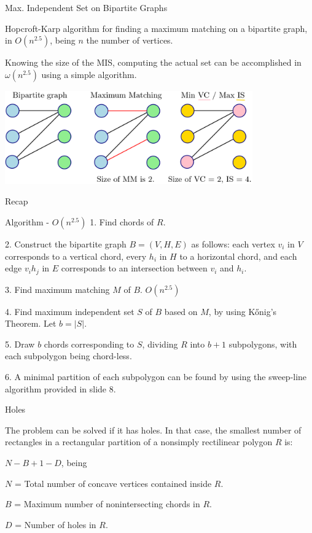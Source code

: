 \documentclass{beamer}
\begin{document}
\begin{frame}[t, shrink=10]{Max. Independent Set on Bipartite Graphs}

Hopcroft-Karp algorithm for finding a maximum matching on a bipartite graph, in $O(n^{2.5})$, being $n$ the number of vertices.

	Knowing the size of the MIS, computing the actual set can be accomplished in $\omega(n^{2.5})$ using a simple algorithm.
	\vspace{10px}

	\centering
    \includegraphics[width=0.8\textwidth]{mis.png}


\end{frame}

\begin{frame}[t, shrink=10]{Recap}

	\begin{block}{Algorithm - $O(n^{2.5})$}
	1. Find chords of $R$.
	
	2. Construct the bipartite graph $B = (V, H, E)$ as follows: each vertex $v_i$ in $V$ corresponds to a vertical chord, every $h_i$ in $H$ to a horizontal chord, and each edge $v_i h_j$ in $E$ corresponds to an intersection between $v_i$ and $h_i$.

	3. Find maximum matching $M$ of $B$. $O(n^{2.5})$
	
	4. Find maximum independent set $S$ of $B$ based on $M$, by using Kőnig's Theorem. Let $b = |S|$.

	5. Draw $b$ chords corresponding to $S$, dividing $R$ into $b + 1$ subpolygons, with each subpolygon being chord-less.
	
	6. A minimal partition of each subpolygon can be found by using the sweep-line algorithm provided in slide 8.
		\end{block}
\end{frame}


\begin{frame}[t]{Holes}

	The problem can be solved if it has holes. In that case, the smallest number of rectangles in a rectangular partition of a nonsimply rectilinear polygon $R$ is:

	\begin{center}
		$N - B + 1 - D$, being 
	\end{center}
	
	$N$ = Total number of concave vertices contained inside $R$. 

	$B$ = Maximum number of nonintersecting chords in $R$. 

	$D$ = Number of holes in $R$. 

\end{frame}
\end{document}
